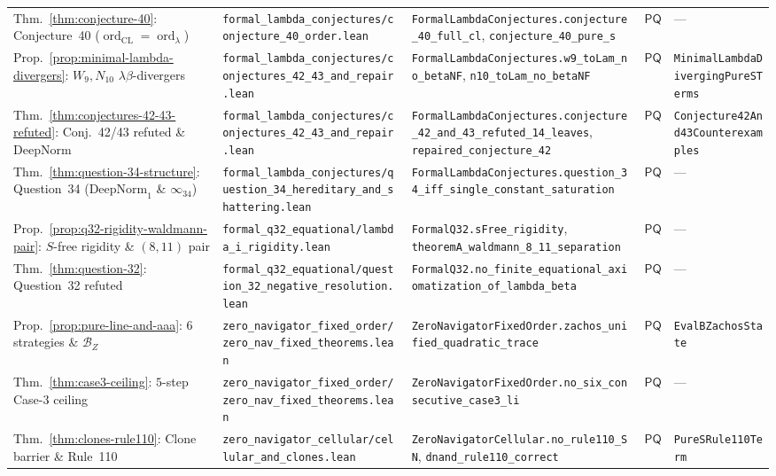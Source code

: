 \documentclass[11pt,reqno]{amsart}
\numberwithin{equation}{section}
\theoremstyle{plain}
\theoremstyle{definition}
\theoremstyle{remark}
\DeclareMathOperator{\ord}{ord}
\begin{document}
\begin{table}[htbp]
\begin{tabular}{@{}lllcl@{}}
Thm.~\ref{thm:conjecture-40}: Conjecture~40 ($\ord_{\mathrm{CL}} = \ord_\lambda$) & \texttt{formal\_lambda\_conjectures/conjecture\_40\_order.lean} & \texttt{FormalLambdaConjectures.conjecture\_40\_full\_cl}, \texttt{conjecture\_40\_pure\_s} & $\mathsf{PQ}$ & --- \\
Prop.~\ref{prop:minimal-lambda-divergers}: $W_9, N_{10}$ $\lambda\beta$-divergers & \texttt{formal\_lambda\_conjectures/conjectures\_42\_43\_and\_repair.lean} & \texttt{FormalLambdaConjectures.w9\_toLam\_no\_betaNF}, \texttt{n10\_toLam\_no\_betaNF} & $\mathsf{PQ}$ & \texttt{MinimalLambdaDivergingPureSTerms} \\
Thm.~\ref{thm:conjectures-42-43-refuted}: Conj.~42/43 refuted \& $\mathrm{DeepNorm}$ & \texttt{formal\_lambda\_conjectures/conjectures\_42\_43\_and\_repair.lean} & \texttt{FormalLambdaConjectures.conjecture\_42\_and\_43\_refuted\_14\_leaves}, \texttt{repaired\_conjecture\_42} & $\mathsf{PQ}$ & \texttt{Conjecture42And43Counterexamples} \\
Thm.~\ref{thm:question-34-structure}: Question~34 ($\mathrm{DeepNorm}_1$ \& $\infty_{34}$) & \texttt{formal\_lambda\_conjectures/question\_34\_hereditary\_and\_shattering.lean} & \texttt{FormalLambdaConjectures.question\_34\_iff\_single\_constant\_saturation} & $\mathsf{PQ}$ & --- \\
Prop.~\ref{prop:q32-rigidity-waldmann-pair}: $S$-free rigidity \& $(8,11)$ pair & \texttt{formal\_q32\_equational/lambda\_i\_rigidity.lean} & \texttt{FormalQ32.sFree\_rigidity}, \texttt{theoremA\_waldmann\_8\_11\_separation} & $\mathsf{PQ}$ & --- \\
Thm.~\ref{thm:question-32}: Question~32 refuted & \texttt{formal\_q32\_equational/question\_32\_negative\_resolution.lean} & \texttt{FormalQ32.no\_finite\_equational\_axiomatization\_of\_lambda\_beta} & $\mathsf{PQ}$ & --- \\
Prop.~\ref{prop:pure-line-and-aaa}: $6$ strategies \& $\mathcal{B}_Z$ & \texttt{zero\_navigator\_fixed\_order/zero\_nav\_fixed\_theorems.lean} & \texttt{ZeroNavigatorFixedOrder.zachos\_unified\_quadratic\_trace} & $\mathsf{PQ}$ & \texttt{EvalBZachosState} \\
Thm.~\ref{thm:case3-ceiling}: $5$-step Case-$3$ ceiling & \texttt{zero\_navigator\_fixed\_order/zero\_nav\_fixed\_theorems.lean} & \texttt{ZeroNavigatorFixedOrder.no\_six\_consecutive\_case3\_li} & $\mathsf{PQ}$ & --- \\
Thm.~\ref{thm:clones-rule110}: Clone barrier \& Rule~110 & \texttt{zero\_navigator\_cellular/cellular\_and\_clones.lean} & \texttt{ZeroNavigatorCellular.no\_rule110\_SN}, \texttt{dnand\_rule110\_correct} & $\mathsf{PQ}$ & \texttt{PureSRule110Term} \\

\end{tabular}
\end{table}
\end{document}
